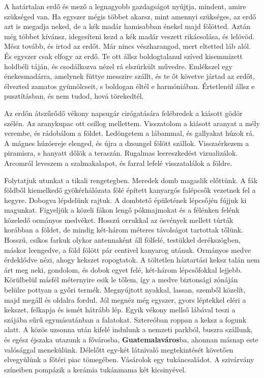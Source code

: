 \begin{itshape}
A határtalan erdő és mező a legnagyobb gazdagságot nyújtja, mindent,
amire szükséged van. Ha egyszer mégis többet akarsz, mint amennyi szükséges,
az erdő azt is megadja neked, de a kék madár hamisabban énekel
majd fölötted. Aztán még többet kívánsz, idegesíteni kezd a kék madár
veszett rikácsolása, és lelövöd. Mész tovább, és irtod az erdőt. Már nincs
vészharangod, mert eltetted láb alól. És egyszer csak elfogy az erdő. Te ott
állsz boldogtalanul szíved kisemmizett holdbéli táján, és csodálkozva
nézel rá elszürkült művedre. Emlékszel egy énekesmadárra, amelynek füttye
messzire szállt, és te őt követve jártad az erdőt, élvezted zamatos gyümölcseit,
s boldogan éltél e harmóniában. Értetlenül állsz e pusztításban, és
nem tudod, hová törekedtél.

Az erdőn átszűrődő vékony napsugár cirógatására felébredek a kiásott
gödör szélén. Az aranykupac ott csillog mellettem. Visszatolom a kiásott
aranyat a mély verembe, és rádobálom a földet. Ledöngetem a lábammal,
és gallyakat húzok rá. A mágnes húzóereje elenged, és újra a dzsungel fölött
szállok. Visszaérkezem a piramisra, s hanyatt dőlök a teraszán. Rugalmas
leereszkedést vizualizálok. Arcomról leveszem a szalmakalapot, és farral
lefelé visszatalálok a földre.
\end{itshape}
\bigskip

Folytatjuk utunkat a tikali rengetegben. Meredek domb magaslik
előttünk. A fák földből kiemelkedő gyökérhálózata fölé épített kanyargós
falépcsők vezetnek fel a hegyre. Dobogva lépdelünk rajtuk.
A dombtető épületének lépcsőjén fújjuk ki magunkat. Figyeljük a
közeli fákon lengő pókmajmokat és a félénken felénk közeledő ormányos
medvéket. Hosszú orrukkal az ösvények mellett túrták korábban
a földet, de mindig két-három méteres távolságot tartottak tőlünk.
Hosszú, csíkos farkuk olykor antennaként áll fölfelé, testükkel derékszögben,
máskor leengedve, a föld fölött pár centivel kanyarog utánuk.
Ormányos medve érdeklődve nézi, ahogy kekszet ropogtatok. A töltetlen
háztartási keksz talán nem árt meg neki, gondolom, és dobok
egyet felé, két-három lépcsőfokkal lejjebb. Körülbelül másfél méternyire
esik le tőlem, így a medve biztonsági zónáján belülre pottyan
a győri termék. Megnyújtott nyakkal, lassan, szemből közelít, majd
megáll és oldalra fordul. Jól megnéz még egyszer, gyors léptekkel eléri
a kekszet, felkapja és ismét hátrább lép. Egyik vékony mellső lábával
teszi a szájába sűrű egymásutánban a falatokat. Sztereóban roppan a
keksz a fogunk alatt. A közös uzsonna után kifelé indulunk a nemzeti
parkból, buszra szállunk, és egész éjszaka utazunk a fővárosba,
\textbf{Guatemalaváros}ba, ahonnan másnap este valósággal menekülünk.
Délelőtt egy-két látnivaló megtekintését követően elvegyülünk a főtéri
piac tömegében. Vásárolok egy tukáncsaládot. A szivárvány színeiben
pompázik a kerámia tukánmama két kicsinyével.

